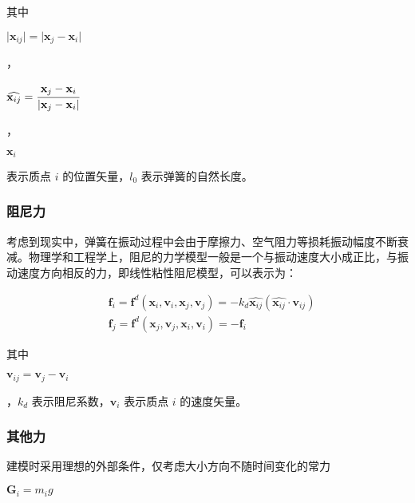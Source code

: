 \documentclass[UTF8]{ctexart}
\begin{document}
其中 \begin{large} $\lvert \mathbf{x}_{ij} \rvert = \lvert \mathbf{x}_{j} - \mathbf{x}_{i} \rvert$ \end{large}，\begin{large}$\widehat{\mathbf{x}_{ij}} = \cfrac{\mathbf{x}_{j} - \mathbf{x}_{i}}{ \lvert \mathbf{x}_{j} - \mathbf{x}_{i} \rvert}$ \end{large}，\begin{large}$ \mathbf{x}_i $\end{large} 表示质点 $i$ 的位置矢量，$l_0$ 表示弹簧的自然长度。 \par

\subsubsection{阻尼力}

考虑到现实中，弹簧在振动过程中会由于摩擦力、空气阻力等损耗振动幅度不断衰减。物理学和工程学上，阻尼的力学模型一般是一个与振动速度大小成正比，与振动速度方向相反的力，即线性粘性阻尼模型，可以表示为：

\begin{large}
\begin{equation}
\begin{split}
&\mathbf{f}_i = \mathbf{f}^d(\mathbf{x}_i, \mathbf{v}_i, \mathbf{x}_j, \mathbf{v}_j)=-k_d \widehat{\mathbf{x}_{ij}} (\widehat{\mathbf{x}_{ij}} \cdot \mathbf{v}_{ij}) \\
&\mathbf{f}_j = \mathbf{f}^d(\mathbf{x}_j, \mathbf{v}_j, \mathbf{x}_i, \mathbf{v}_i)=-\mathbf{f}_i
\end{split}
\end{equation}
\end{large}

其中 \begin{large}$\mathbf{v}_{ij} = \mathbf{v}_j - \mathbf{v}_i$\end{large}，$k_d$ 表示阻尼系数，$\mathbf{v}_i$ 表示质点 $i$ 的速度矢量。 \par

\subsubsection{其他力}

建模时采用理想的外部条件，仅考虑大小方向不随时间变化的常力 \begin{large}$\mathbf{G}_i = m_i g$\end{large} \par
\end{document}
